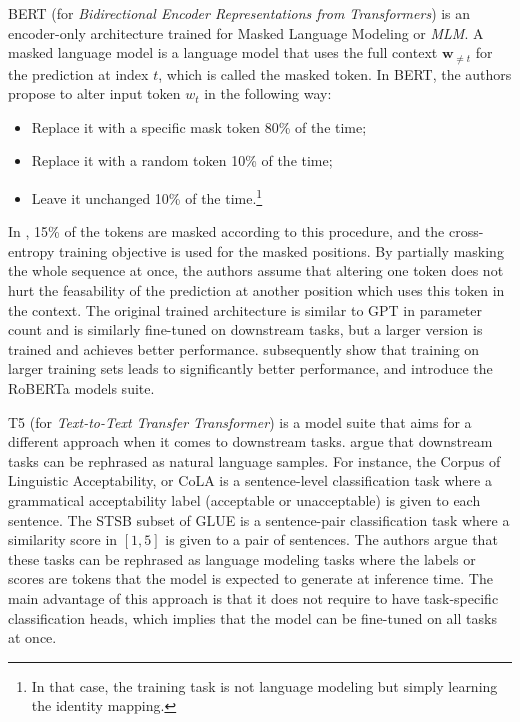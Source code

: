 BERT (for \textit{Bidirectional Encoder Representations from Transformers}) is an encoder-only architecture trained for Masked Language Modeling or \textit{MLM}. A masked language model is a language model that uses the full context $\mathbf{w}_{\neq t}$ for the prediction at index $t$, which is called the masked token. In BERT, the authors propose to alter input token $w_t$ in the following way:
\begin{itemize}
    \item Replace it with a specific mask token 80\% of the time;
    \item Replace it with a random token 10\% of the time;
    \item Leave it unchanged 10\% of the time.\footnote{In that case, the training task is not language modeling but simply learning the identity mapping.}
\end{itemize}

In \citet{devlin-etal-2019-bert}, 15\% of the tokens are masked according to this procedure, and the cross-entropy training objective is used for the masked positions. By partially masking the whole sequence at once, the authors assume that altering one token does not hurt the feasability of the prediction at another position which uses this token in the context.
The original trained architecture is similar to GPT in parameter count and is similarly fine-tuned on downstream tasks, but a larger version is trained and achieves better performance. \citet{roberta} subsequently show that training on larger training sets leads to significantly better performance, and introduce the RoBERTa models suite.

T5 (for \textit{Text-to-Text Transfer Transformer}) is a model suite that aims for a different approach when it comes to downstream tasks. \citet{2020t5} argue that downstream tasks can be rephrased as natural language samples. For instance, the Corpus of Linguistic Acceptability, or CoLA \citep{warstadt2018neural} is a sentence-level classification task where a grammatical acceptability label (acceptable or unacceptable) is given to each sentence. The STSB subset of GLUE \citep{wang-etal-2018-glue} is a sentence-pair classification task where a similarity score in $[1, 5]$ is given to a pair of sentences. The authors argue that these tasks can be rephrased as language modeling tasks where the labels or scores are tokens that the model is expected to generate at inference time. The main advantage of this approach is that it does not require to have task-specific classification heads, which implies that the model can be fine-tuned on all tasks at once.

